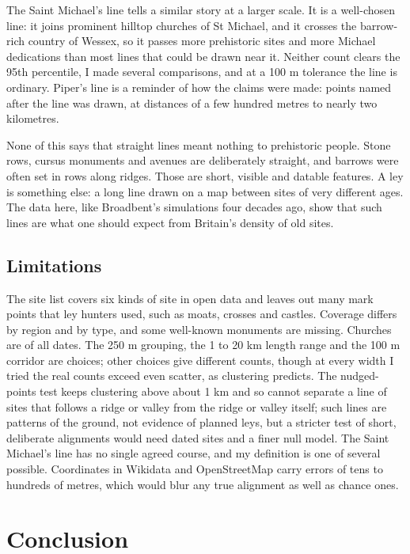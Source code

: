 \documentclass[11pt,a4paper]{article}
\begin{document}
The Saint Michael's line tells a similar story at a larger scale. It is a well-chosen line: it joins prominent hilltop churches of St Michael, and it crosses the barrow-rich country of Wessex, so it passes more prehistoric sites and more Michael dedications than most lines that could be drawn near it. Neither count clears the 95th percentile, I made several comparisons, and at a 100 m tolerance the line is ordinary. Piper's line is a reminder of how the claims were made: points named after the line was drawn, at distances of a few hundred metres to nearly two kilometres.

None of this says that straight lines meant nothing to prehistoric people. Stone rows, cursus monuments and avenues are deliberately straight, and barrows were often set in rows along ridges. Those are short, visible and datable features. A ley is something else: a long line drawn on a map between sites of very different ages. The data here, like Broadbent's simulations four decades ago, show that such lines are what one should expect from Britain's density of old sites.

\subsection{Limitations}

The site list covers six kinds of site in open data and leaves out many mark points that ley hunters used, such as moats, crosses and castles. Coverage differs by region and by type, and some well-known monuments are missing. Churches are of all dates. The 250 m grouping, the 1 to 20 km length range and the 100 m corridor are choices; other choices give different counts, though at every width I tried the real counts exceed even scatter, as clustering predicts. The nudged-points test keeps clustering above about 1 km and so cannot separate a line of sites that follows a ridge or valley from the ridge or valley itself; such lines are patterns of the ground, not evidence of planned leys, but a stricter test of short, deliberate alignments would need dated sites and a finer null model. The Saint Michael's line has no single agreed course, and my definition is one of several possible. Coordinates in Wikidata and OpenStreetMap carry errors of tens to hundreds of metres, which would blur any true alignment as well as chance ones.

\section{Conclusion}
\end{document}
